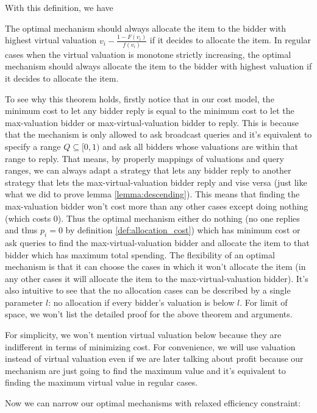 With this definition, we have

\begin{theorem}
The optimal mechanism should always allocate the item to the bidder with
highest virtual valuation $v_i - \frac{1-F(v_i)}{f(v_i)}$ if it decides to
allocate the item. In regular cases when the virtual valuation is monotone
strictly increasing, the optimal mechanism should always allocate the item to
the bidder with highest valuation if it decides to allocate the item.
\end{theorem}

To see why this theorem holds, firstly notice that in our cost model, the
minimum cost to let any bidder reply is equal to the minimum cost to let the
max-valuation bidder or max-virtual-valuation bidder to reply.
This is because that the mechanism is only allowed to ask broadcast
queries and it's equivalent to specify a range $Q \subseteq [0, 1)$ and ask all
bidders whose valuations are within that range to reply. That means, by
properly mappings of valuations and query ranges, we can always adapt a
strategy that lets any bidder reply to another strategy that lets the
max-virtual-valuation bidder reply and vise versa (just like what we did to prove lemma
\ref{lemma:descending}). This means that finding the max-valuation bidder won't
cost more than any other cases except doing nothing (which costs $0$). Thus the
optimal mechanism either do nothing (no one replies and thus $p_i = 0$ by
definition \ref{def:allocation_cost}) which has minimum cost or ask queries to
find the max-virtual-valuation bidder and allocate the item to that bidder which has
maximum total spending.  The flexibility of an optimal mechanism is that it can
choose the cases in which it won't allocate the item (in any other cases it
will allocate the item to the max-virtual-valuation bidder). It's also intuitive
to see that the no allocation cases can be described by a single parameter $l$:
no allocation if every bidder's valuation is below $l$. For limit of space,
we won't list the detailed proof for the above theorem and arguments.

For simplicity, we won't mention virtual valuation below because they are 
indifferent in terms of minimizing cost.  For convenience, we will use
valuation instead of virtual valuation even if we are later talking about
profit because our mechanism are just going to find the maximum value and it's
equivalent to finding the maximum virtual value in regular cases.

Now we can narrow our optimal mechanisms with relaxed efficiency constraint:

